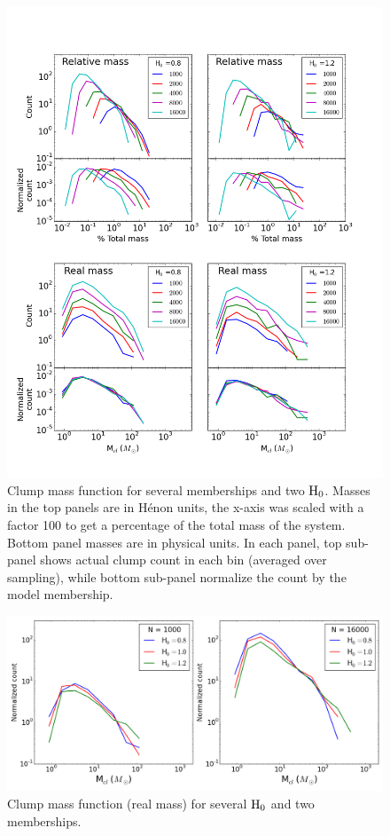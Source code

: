 \begin{figure}
\begin{center}
\includegraphics[width=\columnwidth]{Figures/2_ClumpMF_N.png}
\end{center}
\caption{Clump mass function for several memberships and two ${\textrm{H}}_0$. Masses in the top panels are in H\'enon units, the x-axis was scaled with a factor 100 to get a percentage of the total mass of the system. Bottom panel masses are in physical units. In each panel, top sub-panel shows actual clump count in each bin (averaged over sampling), while bottom sub-panel normalize the count by the model membership. }
\label{Fig:2_ClumpMF_N}
\end{figure} 

\begin{figure}
\begin{center}
\includegraphics[width=0.95\columnwidth]{Figures/2_ClumpMF_H.png}
\end{center}
\caption{Clump mass function (real mass) for several ${\textrm{H}}_0$  and two memberships.}
\label{Fig:2_ClumpMF_H}
\end{figure} 



